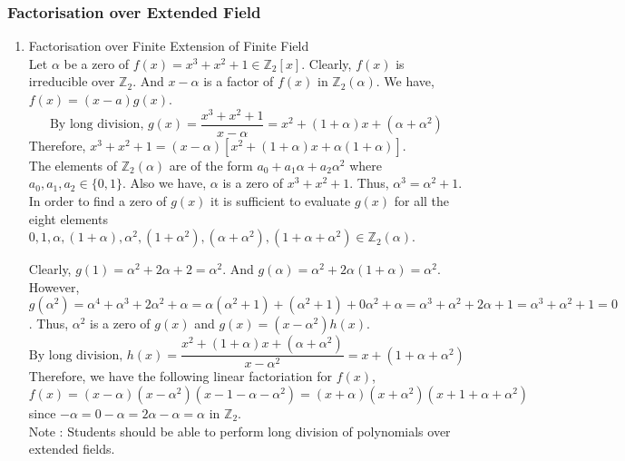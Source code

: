\subsubsection{Factorisation over Extended Field}
\begin{enumerate}
	\item Factorisation over Finite Extension of Finite Field \cite[Exercise 29.25]{fraleigh}\\
		Let $\alpha$ be a zero of $f(x) = x^3+x^2+1 \in \mathbb{Z}_2[x]$. Clearly, $f(x)$ is irreducible over $\mathbb{Z}_2$. And $x-\alpha$ is a factor of $f(x)$ in $\mathbb{Z}_2(\alpha)$. We have, $f(x) = (x-a)g(x)$.
		$$\text{By long division, } g(x) = \frac{x^3+x^2+1}{x-\alpha} = x^2+(1+\alpha)x+(\alpha+\alpha^2)$$
		Therefore, $x^3+x^2+1 = (x-\alpha)[x^2+(1+\alpha)x+\alpha(1+\alpha)]$.\\

		The elements of $\mathbb{Z}_2(\alpha)$ are of the form $a_0+a_1\alpha+a_2\alpha^2$ where $a_0,a_1,a_2 \in \{0,1\}$. Also we have, $\alpha$ is a zero of $x^3+x^2+1$. Thus, $\alpha^3 = \alpha^2+1$.\\

		In order to find a zero of $g(x)$ it is sufficient to evaluate $g(x)$ for all the eight elements $ 0, 1, \alpha, (1+\alpha), \alpha^2, (1+\alpha^2),(\alpha+\alpha^2), (1+\alpha+\alpha^2) \in \mathbb{Z}_2(\alpha)$.
		
		Clearly, $g(1) = \alpha^2+2\alpha+2 = \alpha^2$. And $g(\alpha) = \alpha^2 + 2\alpha(1+\alpha) = \alpha^2$. However, $g(\alpha^2) = \alpha^4+\alpha^3+2\alpha^2+\alpha = \alpha(\alpha^2+1)+(\alpha^2+1) + 0\alpha^2 + \alpha = \alpha^3 + \alpha^2 + 2\alpha + 1 = \alpha^3+\alpha^2+1 = 0$. Thus, $\alpha^2$ is a zero of $g(x)$ and $g(x) = (x-\alpha^2)h(x)$.
	$$\text{By long division, } h(x) = \frac{x^2+(1+\alpha)x+(\alpha+\alpha^2)}{x-\alpha^2} = x+(1+\alpha+\alpha^2)$$
		Therefore, we have the following linear factoriation for $f(x)$,\\ $f(x) = (x-\alpha)(x-\alpha^2)(x-1-\alpha-\alpha^2) = (x+\alpha)(x+\alpha^2)(x+1+\alpha+\alpha^2)$ since $-\alpha = 0-\alpha = 2\alpha-\alpha = \alpha$ in $\mathbb{Z}_2$.\\

	Note : Students should be able to perform long division of polynomials over extended fields.
\end{enumerate}

